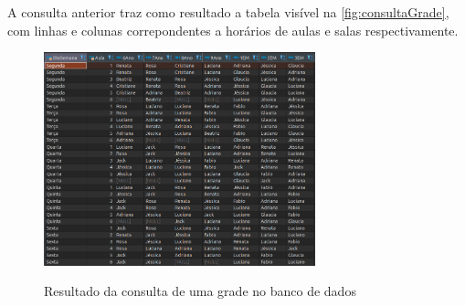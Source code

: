 A consulta anterior traz como resultado a tabela visível na \autoref{fig:consultaGrade}, com linhas e colunas correpondentes a horários de aulas e salas respectivamente.

\begin{figure}[!htb]
	\centering
	\caption{Resultado da consulta de uma grade no banco de dados}
	\includegraphics[width=0.7\textwidth]{./dados/figuras/ConsultaGrade}
	\label{fig:consultaGrade}
\end{figure}
\pagebreak